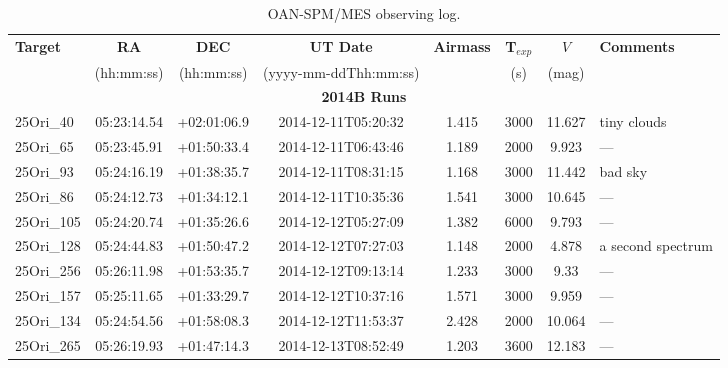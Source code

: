 \documentclass[12pt]{article}
\begin{document}
\begin{table}[ht!] \tiny
\begin{center}
 \caption[OAN-SPM/MES observing log]{OAN-SPM/MES observing log.}
 \label{tab:MES_log}
 \begin{threeparttable}
  	\setlength{\tabcolsep}{11pt}
	\begin{tabular}{lccccccl}
	\toprule
	{\bf Target} & {\bf RA}    & {\bf DEC}    & {\bf UT Date}        & {\bf Airmass} & {\bf T$_{exp}$} & $V$     &  {\bf Comments} \\
	             & (hh:mm:ss)  & (hh:mm:ss)   &(yyyy-mm-ddThh:mm:ss) &               & (s)             & (mag)   &                 \\
	\midrule
	\multicolumn{8}{c}{{\bf 2014B Runs}} \\
	25Ori\_40     & 05:23:14.54 & +02:01:06.9 & 2014-12-11T05:20:32  & 1.415         & 3000             & 11.627 & tiny clouds              \\
	25Ori\_65     & 05:23:45.91 & +01:50:33.4 & 2014-12-11T06:43:46  & 1.189         & 2000             & 9.923  & ---                      \\
	25Ori\_93     & 05:24:16.19 & +01:38:35.7 & 2014-12-11T08:31:15  & 1.168         & 3000             & 11.442 & bad sky                  \\
	25Ori\_86     & 05:24:12.73 & +01:34:12.1 & 2014-12-11T10:35:36  & 1.541         & 3000             & 10.645 & ---                      \\
	25Ori\_105    & 05:24:20.74 & +01:35:26.6 & 2014-12-12T05:27:09  & 1.382         & 6000             & 9.793  & ---                      \\
	25Ori\_128    & 05:24:44.83 & +01:50:47.2 & 2014-12-12T07:27:03  & 1.148         & 2000             & 4.878  & a second spectrum 		\\
	25Ori\_256    & 05:26:11.98 & +01:53:35.7 & 2014-12-12T09:13:14  & 1.233         & 3000             & 9.33   & ---                      \\
	25Ori\_157    & 05:25:11.65 & +01:33:29.7 & 2014-12-12T10:37:16  & 1.571         & 3000             & 9.959  & ---                      \\
	25Ori\_134    & 05:24:54.56 & +01:58:08.3 & 2014-12-12T11:53:37  & 2.428         & 2000             & 10.064 & ---                      \\
	25Ori\_265    & 05:26:19.93 & +01:47:14.3 & 2014-12-13T08:52:49  & 1.203         & 3600             & 12.183 & ---                      \\

\end{tabular}
\end{threeparttable}
\end{center}
\end{table}
\end{document}
